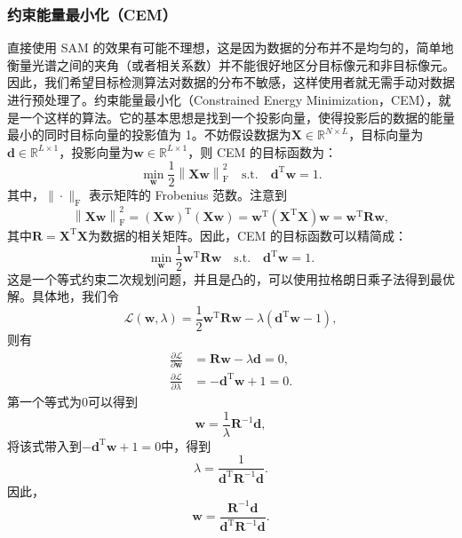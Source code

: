 \subsubsection{约束能量最小化（CEM）}
直接使用 SAM 的效果有可能不理想，这是因为数据的分布并不是均匀的，简单地衡量光谱之间的夹角（或者相关系数）并不能很好地区分目标像元和非目标像元。因此，我们希望目标检测算法对数据的分布不敏感，这样使用者就无需手动对数据进行预处理了。约束能量最小化（Constrained Energy Minimization，CEM），就是一个这样的算法。它的基本思想是找到一个投影向量，使得投影后的数据的能量最小的同时目标向量的投影值为 1。不妨假设数据为\(\mathbf{X} \in \mathbb{R}^{N \times L}\)，目标向量为\(\bm{d} \in \mathbb{R}^{L \times 1}\)，投影向量为\(\bm{w} \in \mathbb{R}^{L \times 1}\)，则 CEM 的目标函数为：
\[
    \min_{\bm{w}} \frac{1}{2}\left\| \mathbf{X} \bm{w} \right\|_{\mathrm{F}}^{2} \quad \text{s.t.} \quad \bm{d}^{\mathrm{T}}\bm{w} = 1. 
\]
其中，\(\|\cdot\|_{\mathrm{F}}\) 表示矩阵的 Frobenius 范数。注意到
\[
    \left\| \mathbf{X} \bm{w} \right\|_{\mathrm{F}}^{2} = (\mathbf{X} \bm{w})^{\mathrm{T}}(\mathbf{X} \bm{w}) = \bm{w}^{\mathrm{T}}(\mathbf{X}^{\mathrm{T}}\mathbf{X})\bm{w} = \bm{w}^{\mathrm{T}}\mathbf{R}\bm{w},
\]
其中\(\mathbf{R} = \mathbf{X}^{\mathrm{T}}\mathbf{X}\)为数据的相关矩阵。因此，CEM 的目标函数可以精简成：
\[
    \min_{\bm{w}} \frac{1}{2} \bm{w}^{\mathrm{T}}\mathbf{R}\bm{w} \quad \text{s.t.} \quad \bm{d}^{\mathrm{T}}\bm{w} = 1.    
\]
这是一个等式约束二次规划问题，并且是凸的，可以使用拉格朗日乘子法得到最优解。具体地，我们令
\[
    \mathcal{L}(\bm{w}, \lambda) = \frac{1}{2} \bm{w}^{\mathrm{T}}\mathbf{R}\bm{w} - \lambda\left(\bm{d}^{\mathrm{T}}\bm{w} - 1\right),
\]
则有
\[
    \begin{aligned}
        \frac{\partial \mathcal{L}}{\partial \bm{w}}  & = \mathbf{R}\bm{w} - \lambda\bm{d} = 0, \\
        \frac{\partial \mathcal{L}}{\partial \lambda} & = -\bm{d}^{\mathrm{T}}\bm{w} + 1 = 0.
    \end{aligned}
\]
第一个等式为0可以得到
\[
    \bm{w} = \frac{1}{\lambda}\mathbf{R}^{-1}\bm{d},  
\]
将该式带入到\(-\bm{d}^{\mathrm{T}}\bm{w} + 1 = 0\)中，得到
\[
    \lambda = \frac{1}{\bm{d}^{\mathrm{T}}\mathbf{R}^{-1}\bm{d}}.
\]
因此，
\[
    \bm{w} = \frac{\mathbf{R}^{-1}\bm{d}}{\bm{d}^{\mathrm{T}}\mathbf{R}^{-1}\bm{d}}.
\]
